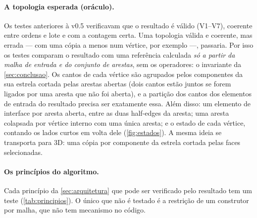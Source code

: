 \paragraph{A topologia esperada (oráculo).} Os testes anteriores à v0.5 verificavam que o resultado é válido (V1--V7),
coerente entre ordens e lote e com a contagem certa. Uma topologia válida e coerente, mas errada --- com uma cópia a
menos num vértice, por exemplo ---, passaria. Por isso os testes comparam o resultado com uma referência calculada
\emph{só a partir da malha de entrada e do conjunto de arestas}, sem os operadores: o invariante da
\cref{sec:conclusao}. Os cantos de cada vértice são agrupados pelos componentes da sua estrela cortada pelas arestas
abertas (dois cantos estão juntos se forem ligados por uma aresta que não foi aberta), e a partição dos cantos dos
elementos de entrada do resultado precisa ser exatamente essa. Além disso: um elemento de interface por aresta aberta,
entre as duas half-edges da aresta; uma aresta colapsada por vértice interno com uma única aresta; e o estado de cada
vértice, contando os lados curtos em volta dele (\cref{fig:estados}). A mesma ideia se transporta para 3D: uma cópia
por componente da estrela cortada pelas faces selecionadas.

\paragraph{Os princípios do algoritmo.} Cada princípio da \cref{sec:arquitetura} que pode ser verificado pelo resultado
tem um teste (\cref{tab:principios}). O único que não é testado é a restrição de um construtor por malha, que não tem
mecanismo no código.

